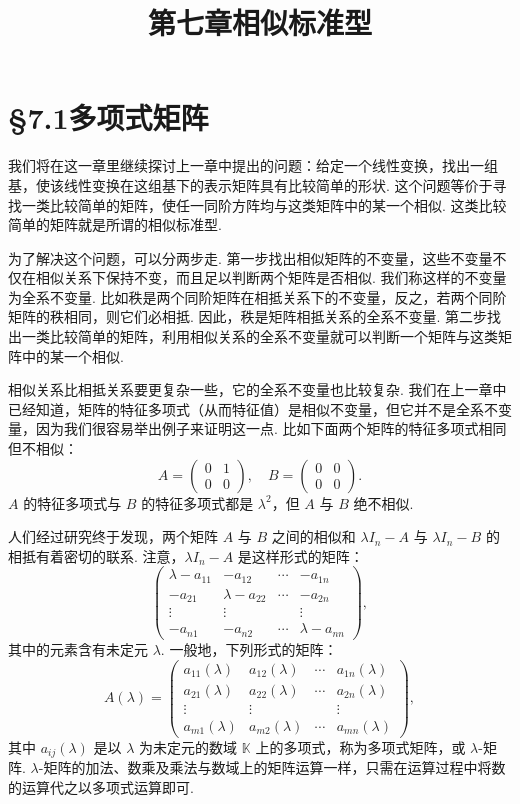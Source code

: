 \documentclass[UTF8,12pt,a4paper,fontset=fandol]{ctexart}
\title{第七章\quad 相似标准型}
\author{}
\date{}
\begin{document}
\maketitle

\section*{§7.1\quad 多项式矩阵}

我们将在这一章里继续探讨上一章中提出的问题：给定一个线性变换，找出一组基，使该线性变换在这组基下的表示矩阵具有比较简单的形状. 这个问题等价于寻找一类比较简单的矩阵，使任一同阶方阵均与这类矩阵中的某一个相似. 这类比较简单的矩阵就是所谓的相似标准型.

为了解决这个问题，可以分两步走. 第一步找出相似矩阵的不变量，这些不变量不仅在相似关系下保持不变，而且足以判断两个矩阵是否相似. 我们称这样的不变量为全系不变量. 比如秩是两个同阶矩阵在相抵关系下的不变量，反之，若两个同阶矩阵的秩相同，则它们必相抵. 因此，秩是矩阵相抵关系的全系不变量. 第二步找出一类比较简单的矩阵，利用相似关系的全系不变量就可以判断一个矩阵与这类矩阵中的某一个相似.

相似关系比相抵关系要更复杂一些，它的全系不变量也比较复杂. 我们在上一章中已经知道，矩阵的特征多项式（从而特征值）是相似不变量，但它并不是全系不变量，因为我们很容易举出例子来证明这一点. 比如下面两个矩阵的特征多项式相同但不相似：
\[
A=\left(\begin{array}{cc}
0 & 1\\
0 & 0
\end{array}\right),\quad
B=\left(\begin{array}{cc}
0 & 0\\
0 & 0
\end{array}\right).
\]
$A$ 的特征多项式与 $B$ 的特征多项式都是 $\lambda^2$，但 $A$ 与 $B$ 绝不相似.

人们经过研究终于发现，两个矩阵 $A$ 与 $B$ 之间的相似和 $\lambda I_n-A$ 与 $\lambda I_n-B$ 的相抵有着密切的联系. 注意，$\lambda I_n-A$ 是这样形式的矩阵：
\[
\left(\begin{array}{cccc}
\lambda-a_{11} & -a_{12} & \cdots & -a_{1n}\\
-a_{21} & \lambda-a_{22} & \cdots & -a_{2n}\\
\vdots & \vdots & & \vdots\\
-a_{n1} & -a_{n2} & \cdots & \lambda-a_{nn}
\end{array}\right),
\]
其中的元素含有未定元 $\lambda$. 一般地，下列形式的矩阵：
\[
A(\lambda)=
\left(\begin{array}{cccc}
a_{11}(\lambda) & a_{12}(\lambda) & \cdots & a_{1n}(\lambda)\\
a_{21}(\lambda) & a_{22}(\lambda) & \cdots & a_{2n}(\lambda)\\
\vdots & \vdots & & \vdots\\
a_{m1}(\lambda) & a_{m2}(\lambda) & \cdots & a_{mn}(\lambda)
\end{array}\right),
\]
其中 $a_{ij}(\lambda)$ 是以 $\lambda$ 为未定元的数域 $\mathbb{K}$ 上的多项式，称为多项式矩阵，或 $\lambda$-矩阵. $\lambda$-矩阵的加法、数乘及乘法与数域上的矩阵运算一样，只需在运算过程中将数的运算代之以多项式运算即可.
\end{document}
